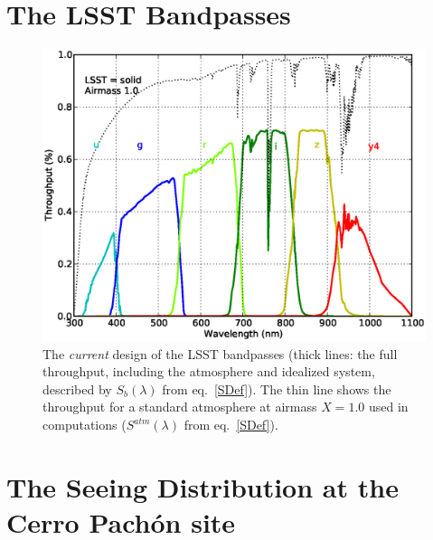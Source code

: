 \clearpage
\section{The LSST Bandpasses}

\begin{figure}[h]\centering
\includegraphics[width=\textwidth]{filters_thruputs}
\caption{The \textit{current} design of the LSST bandpasses (thick lines:
the full throughput, including the atmosphere and idealized system,
described by $S_b(\lambda)$ from eq.~\ref{SDef}).
The thin line shows the throughput for a standard atmosphere at
airmass $X=1.0$ used in computations ($S^{atm}(\lambda)$ from eq.~\ref{SDef}).}
\end{figure}


\clearpage
\section{The Seeing Distribution at the Cerro Pach\'{o}n site}

